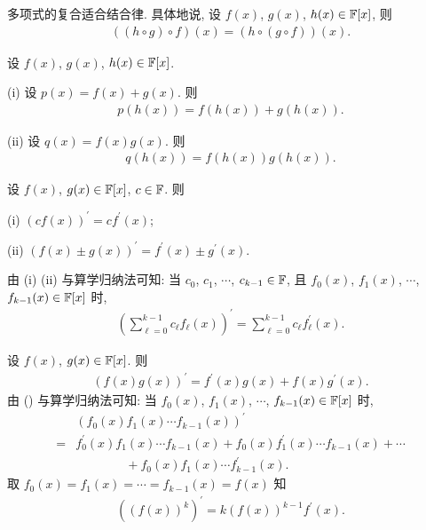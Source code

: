 \begin{proposition}
    多项式的复合适合结合律. 具体地说, 设 $f(x)$, $g(x)$, $h(x) \in \mathbb{F}[x]$, 则
    \begin{align*}
        ((h \circ g) \circ f)(x) = (h \circ (g \circ f))(x).
    \end{align*}
\end{proposition}

\begin{proposition}
    设 $f(x)$, $g(x)$, $h(x) \in \mathbb{F}[x]$.

    (i) 设 $p(x) = f(x) + g(x)$. 则
    \begin{align*}
        p(h(x)) = f(h(x)) + g(h(x)).
    \end{align*}

    (ii) 设 $q(x) = f(x) g(x)$. 则
    \begin{align*}
        q(h(x)) = f(h(x)) g(h(x)).
    \end{align*}
\end{proposition}

\begin{proposition}
    设 $f(x)$, $g(x) \in \mathbb{F}[x]$, $c \in \mathbb{F}$. 则

    (i) $(cf(x))^{\prime} = c f^{\prime} (x)$;

    (ii) $(f(x) \pm g(x))^{\prime} = f^{\prime} (x) \pm g^{\prime} (x)$.

    由 (i) (ii) 与算学归纳法可知: 当 $c_0$, $c_1$, $\cdots$, $c_{k-1} \in \mathbb{F}$, 且 $f_0 (x)$, $f_1 (x)$, $\cdots$, $f_{k-1} (x) \in \mathbb{F}[x]$ 时,
    \begin{align*}
        \left( \sum_{\ell = 0}^{k-1} c_\ell f_\ell (x) \right)^{\prime} = \sum_{\ell = 0}^{k-1} c_\ell f_\ell^{\prime} (x).
    \end{align*}
\end{proposition}

\begin{proposition}
    设 $f(x)$, $g(x) \in \mathbb{F}[x]$. 则
    \begin{align*}
        (f(x) g(x))^{\prime} = f^{\prime} (x) g(x) + f(x) g^{\prime} (x). \tag*{(\myStar)}
    \end{align*}
    由 (\myStar) 与算学归纳法可知: 当 $f_0 (x)$, $f_1 (x)$, $\cdots$, $f_{k-1} (x) \in \mathbb{F}[x]$ 时,
    \begin{align*}
             & (f_0 (x) f_1 (x) \cdots f_{k-1} (x))^{\prime}                                                      \\
        = {} & f_0^{\prime} (x) f_1 (x) \cdots f_{k-1} (x) + f_0 (x) f_1^{\prime} (x) \cdots f_{k-1} (x) + \cdots \\
             & \qquad \qquad + f_0 (x) f_1 (x) \cdots f_{k-1}^{\prime} (x).
    \end{align*}
    取 $f_0 (x) = f_1 (x) = \cdots = f_{k-1} (x) = f(x)$ 知
    \begin{align*}
        ((f(x))^k)^{\prime} = k(f(x))^{k-1} f^{\prime} (x).
    \end{align*}
\end{proposition}

